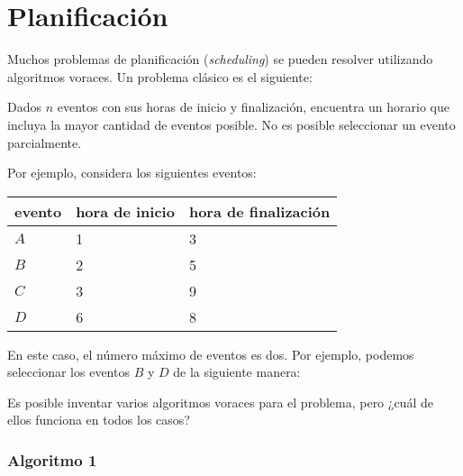 \section{Planificación}

Muchos problemas de planificación (\textit{scheduling})
se pueden resolver utilizando algoritmos voraces.
Un problema clásico es el siguiente:

\begin{framed}
  \noindent Dados $n$ eventos con sus horas de inicio y finalización,
  encuentra un horario que incluya la mayor cantidad de eventos posible.
  No es posible seleccionar un evento parcialmente.
\end{framed}

\newpage
Por ejemplo, considera los siguientes eventos:
\begin{center}
  \begin{tabular}{lll}
    evento & hora de inicio & hora de finalización \\
    \hline
    $A$    & 1              & 3                    \\
    $B$    & 2              & 5                    \\
    $C$    & 3              & 9                    \\
    $D$    & 6              & 8                    \\
  \end{tabular}
\end{center}
En este caso, el número máximo de eventos es dos.
Por ejemplo, podemos seleccionar los eventos $B$ y $D$
de la siguiente manera:
\begin{center}
\end{center}

Es posible inventar varios algoritmos voraces
para el problema, pero ¿cuál de ellos funciona en todos los casos?

\subsubsection*{Algoritmo 1}

